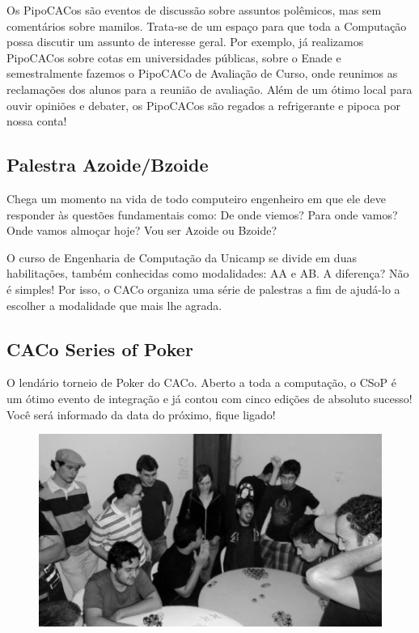 Os PipoCACos são eventos de discussão sobre assuntos polêmicos, mas sem
comentários sobre  mamilos. Trata-se de um espaço para que toda a Computação
possa discutir um assunto de interesse geral. Por exemplo, já realizamos
PipoCACos sobre cotas em universidades públicas, sobre o Enade e semestralmente fazemos o PipoCACo de
Avaliação de Curso, onde reunimos as reclamações dos alunos para a reunião de
avaliação. Além de um ótimo local para ouvir opiniões e debater, os PipoCACos
são regados a refrigerante e pipoca por nossa conta!

\subsection{Palestra Azoide/Bzoide}

Chega um momento na vida de todo computeiro engenheiro em que ele deve responder
às questões fundamentais como: De onde viemos? Para onde vamos? Onde vamos
almoçar hoje? Vou ser Azoide ou Bzoide?

O curso de Engenharia de Computação da Unicamp se divide em duas habilitações, também conhecidas como modalidades: AA
e AB. A diferença? Não é simples! Por isso, o CACo organiza uma série de
palestras a fim de ajudá-lo a escolher a modalidade que mais lhe agrada.

\subsection{CACo Series of Poker}

O lendário torneio de Poker do CACo. Aberto a toda a computação, o CSoP é um
ótimo evento de integração e já contou com cinco edições de absoluto sucesso!
Você será informado da data do próximo, fique ligado!

\begin{figure}[H]
    \centering
    \includegraphics[scale=0.21]{img/caco/poker2.jpg}
\end{figure}

